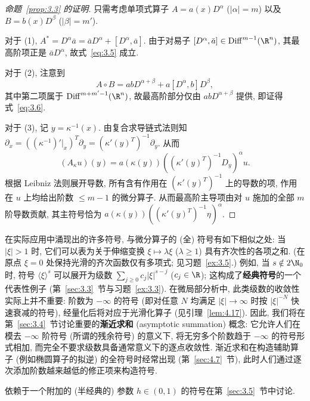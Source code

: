 \begin{proof}[命题~\ref{prop:3.3} 的证明]
只需考虑单项式算子 $A = a(x) D^\alpha$ ($|\alpha| = m$) 以及 $B = b(x) D^\beta$ ($|\beta| = m'$).

对于 (1), $A^* = D^\alpha \bar{a} = \bar{a} D^\alpha + [D^\alpha, \bar{a}]$. 由于对易子 $[D^\alpha, \bar{a}] \in \Diff^{m-1}(\R^n)$, 其最高阶项正是 $\bar{a} D^\alpha$, 故式~\eqref{eq:3.5} 成立.

对于 (2), 注意到
\begin{equation}\label{eq:3.8}
    A \circ B = a b D^{\alpha + \beta} + a [D^\alpha, b] D^\beta,
\end{equation}
其中第二项属于 $\Diff^{m+m'-1}(\R^n)$, 故最高阶部分仅由 $a b D^{\alpha+\beta}$ 提供, 即证得式~\eqref{eq:3.6}.

对于 (3), 记 $y = \kappa^{-1}(x)$. 由复合求导链式法则知 $\partial_x = ((\kappa^{-1})'|_x)^T \partial_y = (\kappa'(y)^T)^{-1} \partial_y$. 从而
\begin{equation}\label{eq:3.9}
    (A_\kappa u)(y) = a(\kappa(y)) \left( (\kappa'(y)^T)^{-1} D_y \right)^\alpha u.
\end{equation}
根据 Leibniz 法则展开导数, 所有含有作用在 $(\kappa'(y)^T)^{-1}$ 上的导数的项, 作用在 $u$ 上均给出阶数 $\le m - 1$ 的微分算子. 从而最高阶主导项由对 $u$ 施加的全部 $m$ 阶导数贡献, 其主符号恰为 $a(\kappa(y)) ((\kappa'(y)^T)^{-1} \eta)^\alpha$.
\end{proof}

在实际应用中涌现出的许多符号, 与微分算子的 (全) 符号有如下相似之处: 当 $|\xi| > 1$ 时, 它们可以表为关于伸缩变换 $\xi \mapsto \lambda \xi$ ($\lambda \ge 1$) 具有齐次性的各项之和. (在原点 $\xi = 0$ 处保持光滑的齐次函数仅有多项式; 见习题~\ref{ex:3.5}.) 例如, 当 $s \notin 2\N_0$ 时, 符号 $\langle \xi \rangle^s$ 可以展开为级数 $\sum_{j \ge 0} c_j |\xi|^{s-j}$ ($c_j \in \R$); 这构成了\textbf{经典符号}的一个代表性例子 (第~\ref{sec:3.3}~节与习题~\ref{ex:3.3}). 在微局部分析中, 此类级数的收敛性实际上并不重要: 阶数为 $-\infty$ 的符号 (即对任意 $N$ 均满足 $|\xi| \to \infty$ 时按 $|\xi|^{-N}$ 快速衰减的符号), 经量化后将对应于光滑化算子 (见引理~\ref{lem:4.17}). 因此, 我们将在第~\ref{sec:3.4}~节讨论重要的\textbf{渐近求和} (asymptotic summation) 概念: 它允许人们在模去 $-\infty$ 阶符号 (所谓的残余符号) 的意义下, 将无穷多个阶数趋于 $-\infty$ 的符号形式相加, 而完全不要求级数具备通常意义下的逐点收敛性. 渐近求和在构造辅助算子 (例如椭圆算子的拟逆) 的全符号时经常出现 (第~\ref{sec:4.7}~节), 此时人们通过逐次添加阶数越来越低的修正项来构造符号.

依赖于一个附加的 (半经典的) 参数 $h \in (0, 1)$ 的符号在第~\ref{sec:3.5}~节中讨论.

